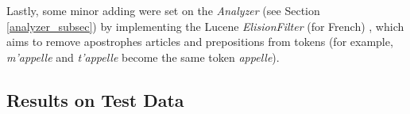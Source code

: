 Lastly, some minor adding were set on the \textit{Analyzer} (see Section \ref{analyzer_subsec}) by implementing the Lucene \textit{ElisionFilter} (for French) \cite{luceneelisionfilter}, which aims to remove apostrophes articles and prepositions from tokens (for example, \textit{m'appelle} and \textit{t'appelle} become the same token \textit{appelle}).


\subsection{Results on Test Data}
\label{subsec:results_submission}


\pagebreak
